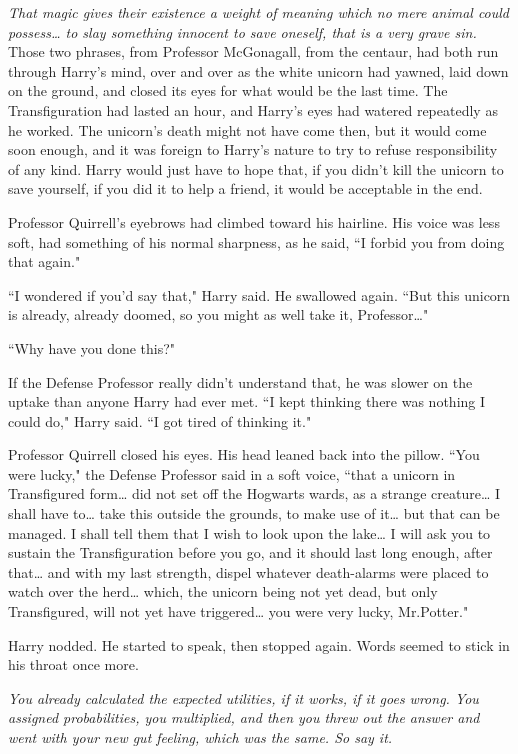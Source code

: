 \emph{That magic gives their existence a weight of meaning which no mere animal could possess{\ldots} to slay something innocent to save oneself, that is a very grave sin.} Those two phrases, from Professor McGonagall, from the centaur, had both run through Harry's mind, over and over as the white unicorn had yawned, laid down on the ground, and closed its eyes for what would be the last time. The Transfiguration had lasted an hour, and Harry's eyes had watered repeatedly as he worked. The unicorn's death might not have come then, but it would come soon enough, and it was foreign to Harry's nature to try to refuse responsibility of any kind. Harry would just have to hope that, if you didn't kill the unicorn to save yourself, if you did it to help a friend, it would be acceptable in the end.

Professor Quirrell's eyebrows had climbed toward his hairline. His voice was less soft, had something of his normal sharpness, as he said, ``I forbid you from doing that again."

``I wondered if you'd say that," Harry said. He swallowed again. ``But this unicorn is already, already doomed, so you might as well take it, Professor{\ldots}"

``Why have you done this?"

If the Defense Professor really didn't understand that, he was slower on the uptake than anyone Harry had ever met. ``I kept thinking there was nothing I could do," Harry said. ``I got tired of thinking it."

Professor Quirrell closed his eyes. His head leaned back into the pillow. ``You were lucky," the Defense Professor said in a soft voice, ``that a unicorn in Transfigured form{\ldots} did not set off the Hogwarts wards, as a strange creature{\ldots} I shall have to{\ldots} take this outside the grounds, to make use of it{\ldots} but that can be managed. I shall tell them that I wish to look upon the lake{\ldots} I will ask you to sustain the Transfiguration before you go, and it should last long enough, after that{\ldots} and with my last strength, dispel whatever death-alarms were placed to watch over the herd{\ldots} which, the unicorn being not yet dead, but only Transfigured, will not yet have triggered{\ldots} you were very lucky, Mr.\?Potter."

Harry nodded. He started to speak, then stopped again. Words seemed to stick in his throat once more.

\emph{You already calculated the expected utilities, if it works, if it goes wrong. You assigned probabilities, you multiplied, and then you threw out the answer and went with your new gut feeling, which was the same. So say it.}

